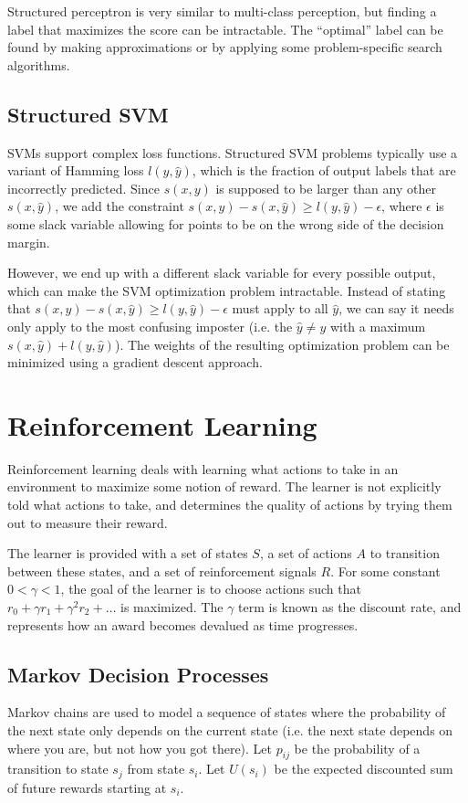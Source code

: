 \documentclass[12pt,titlepage]{article}
\let\stdsection\section
\renewcommand\section{\clearpage\stdsection}
\begin{document}
      Structured perceptron is very similar to multi-class perception, but finding a label that maximizes the score can be intractable. The ``optimal'' label can be found by
      making approximations or by applying some problem-specific search algorithms.

    \subsection{Structured SVM}
      SVMs support complex loss functions. Structured SVM problems typically use a variant of Hamming loss $l(y, \hat{y})$, which is the fraction of output labels that are
      incorrectly predicted. Since $s(x, y)$ is supposed to be larger than any other $s(x, \hat{y})$, we add the constraint $s(x, y) - s(x, \hat{y}) \geq l(y, \hat{y}) - \epsilon$,
      where $\epsilon$ is some slack variable allowing for points to be on the wrong side of the decision margin.

      However, we end up with a different slack variable for every possible output, which can make the SVM optimization problem intractable. Instead of stating that
      $s(x, y) - s(x, \hat{y}) \geq l(y, \hat{y}) - \epsilon$ must apply to all $\hat{y}$, we can say it needs only apply to the most confusing imposter (i.e. the $\hat{y} \neq y$
      with a maximum $s(x, \hat{y}) + l(y, \hat{y})$). The weights of the resulting optimization problem can be minimized using a gradient descent approach.

  \section{Reinforcement Learning}
    Reinforcement learning deals with learning what actions to take in an environment to maximize some notion of reward. The learner is not explicitly told what actions to
    take, and determines the quality of actions by trying them out to measure their reward.

    The learner is provided with a set of states $S$, a set of actions $A$ to transition between these states, and a set of reinforcement signals $R$. For some constant
    $0 < \gamma < 1$, the goal of the learner is to choose actions such that $r_0 + \gamma r_1 + \gamma^2 r_2 + \dots$ is maximized. The $\gamma$ term is known as the
    discount rate, and represents how an award becomes devalued as time progresses.

    \subsection{Markov Decision Processes}
      Markov chains are used to model a sequence of states where the probability of the next state only depends on the current state (i.e. the next state depends on where
      you are, but not how you got there). Let $p_{ij}$ be the probability of a transition to state $s_j$ from state $s_i$. Let $U(s_i)$ be the expected discounted sum of
      future rewards starting at $s_i$.
\end{document}
